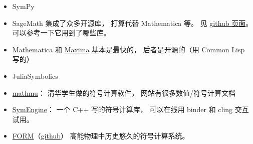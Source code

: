
\begin{issues}
\issueDraft
\end{issues}

\begin{itemize}
\item SymPy
\item SageMath 集成了众多开源库， 打算代替 Mathematica 等。 见 \href{https://github.com/sagemath/sage/}{github 页面}。 可以参考一下它用到了哪些库。
\item Mathematica 和 \href{https://maxima.sourceforge.io/}{Maxima} 基本是最快的， 后者是开源的（用 Common Lisp 写的）
\item JuliaSymbolics
\item \href{http://mathmu.github.io/MTCAS/RecentChanges.html}{mathmu}： 清华学生做的符号计算软件， 网站有很多数值/符号计算文档
\item \href{https://github.com/symengine/symengine}{SymEngine}： 一个 C++ 写的符号计算库， 可以在线用 binder 和 cling 交互试用。
\item \href{https://www.nikhef.nl/~form/}{FORM}（\href{https://github.com/vermaseren/form}{github}） 高能物理中历史悠久的符号计算系统。
\end{itemize}
